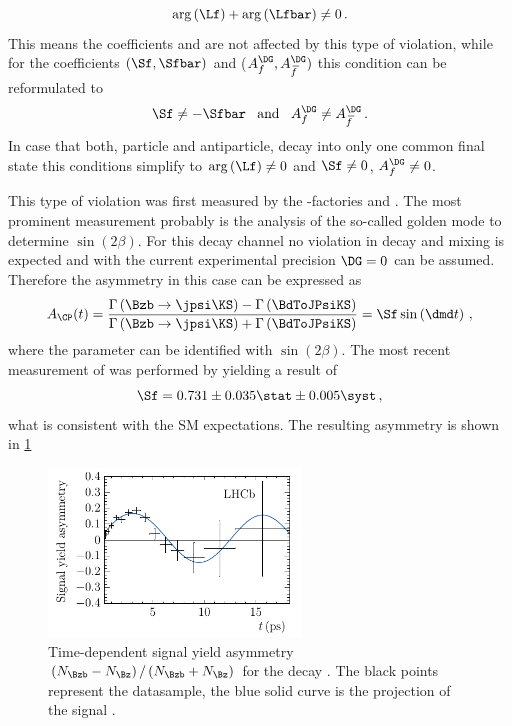 \begin{equation}
	\arg\left(\Lf\right)+\arg\left(\Lfbar\right)\neq0\,. \label{eq:conditionCPV}
\end{equation}
This means the \CP coefficients \Cf and \Cfbar are not affected by this type of \CP violation, while for the coefficients $(\Sf, \Sfbar)$ and  ($A_f^{\DG}, A_{\kern 1.5pt\overline{\kern -1.5pt f\kern 1.5pt}}^{\DG})$ this condition can be reformulated to
\begin{equation}
\Sf\neq-\Sfbar\,\,\,\,\,\text{and}\,\,\,\,\,A_f^{\DG}\neq A_{\kern 1.5pt\overline{\kern -1.5pt f\kern 1.5pt}}^{\DG}\,.
\end{equation}
In case that both, particle and antiparticle, decay into only one common final state this conditions simplify to $\arg\left(\Lf\right)\neq0$ and $\Sf\neq0$, $A_f^{\DG}\neq0$.

This type of \CP violation was first measured by the \B-factories \babar \cite{Aubert:2001nu} and \belle \cite{Abe:2001xe}.
The most prominent measurement probably is the analysis of the so-called golden mode \BdToJPsiKS to determine $\sin\!\left(2\beta\right)$.
For this decay channel no \CP violation in decay and mixing is expected and with the current experimental precision $\DG=0$ can be assumed.
Therefore the \CP asymmetry in this case can be expressed as
\begin{equation}
A_{\CP}(t)=\frac{\Gamma\left(\Bzb\to\jpsi\KS\right)-\Gamma\left(\BdToJPsiKS\right)}{\Gamma\left(\Bzb\to\jpsi\KS\right)+\Gamma\left(\BdToJPsiKS\right)}=\Sf\sin\left(\dmd t\right)\,,\label{eq:CPAsymBd2JpsiKS}
\end{equation}
where the parameter \Sf can be identified with $\sin{}\left(2\beta\right)$.
The most recent measurement of \Sf was performed by \lhcb \cite{Aaij:2015vza} yielding a result of
\begin{equation}
\Sf=0.731\pm0.035\stat\pm0.005\syst\,,
\end{equation}
what is consistent with the \ac{SM} expectations. The resulting \CP asymmetry is shown in \cref{fig:sin2beta}
\begin{figure}[tbp]
	\centering
	\includegraphics[width=0.6\textwidth]{03CPV/figs/InterferenceCPV.pdf}
	\caption{Time-dependent signal yield asymmetry $\left(N_{\Bzb}-N_{\Bz}\right)/\left(N_{\Bzb}+N_{\Bz}\right)$ for the decay \BdToJPsiKS.
	The black points represent the datasample, the blue solid curve is the projection of the signal \PDF.}
	\label{fig:sin2beta}
\end{figure}

